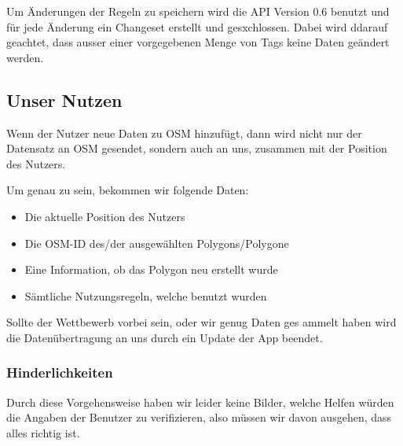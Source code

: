 Um Änderungen der Regeln zu speichern wird die API Version 0.6 benutzt und für jede Änderung ein Changeset erstellt und gesxchlossen.
Dabei wird ddarauf geachtet, dass ausser einer vorgegebenen Menge von Tags keine Daten geändert werden.

\subsection{Unser Nutzen}
Wenn der Nutzer neue Daten zu OSM hinzufügt, dann wird nicht nur der Datensatz an OSM gesendet, sondern auch an uns, zusammen mit der Position des Nutzers.

Um genau zu sein, bekommen wir folgende Daten:
\begin{itemize}
\item Die aktuelle Position des Nutzers
\item Die OSM-ID des/der ausgewählten Polygons/Polygone
\item Eine Information, ob das Polygon neu erstellt wurde
\item Sämtliche Nutzungsregeln, welche benutzt wurden
\end{itemize}
Sollte der Wettbewerb vorbei sein, oder wir genug Daten ges	ammelt haben wird die
 Datenübertragung an uns durch ein Update der App beendet.
 
 

\subsubsection{Hinderlichkeiten}
Durch diese Vorgehensweise haben wir leider keine Bilder, welche Helfen würden die Angaben der Benutzer zu verifizieren,
also müssen wir davon ausgehen, dass alles richtig ist.